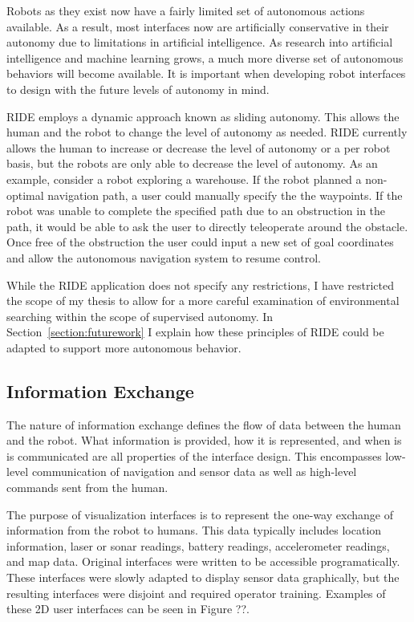 Robots as they exist now have a fairly limited set of autonomous actions available. As a result, most interfaces now are artificially conservative in their autonomy due to limitations in artificial intelligence. As research into artificial intelligence and machine learning grows, a much more diverse set of autonomous behaviors will become available. It is important when developing robot interfaces to design with the future levels of autonomy in mind. 

RIDE employs a dynamic approach known as sliding autonomy. This allows the human and the robot to change the level of autonomy as needed. RIDE currently allows the human to increase or decrease the level of autonomy or a per robot basis, but the robots are only able to decrease the level of autonomy. As an example, consider a robot exploring a warehouse. If the robot planned a non-optimal navigation path, a user could manually specify the the waypoints. If the robot was unable to complete the specified path due to an obstruction in the path, it would be able to ask the user to directly teleoperate around the obstacle. Once free of the obstruction the user could input a new set of goal coordinates and allow the autonomous navigation system to resume control.

While the RIDE application does not specify any restrictions, I have restricted the scope of my thesis to allow for a more careful examination of environmental searching within the scope of supervised autonomy. In Section~\ref{section:futurework} I explain how these principles of RIDE could be adapted to support more autonomous behavior.

\subsection{Information Exchange}

The nature of information exchange defines the flow of data between the human and the robot. What information is provided, how it is represented, and when is is communicated are all properties of the interface design. This encompasses low-level communication of navigation and sensor data as well as high-level commands sent from the human. 

The purpose of visualization interfaces is to represent the one-way exchange of information from the robot to humans. This data typically includes location information, laser or sonar readings, battery readings, accelerometer readings, and map data. Original interfaces were written to be accessible programatically. These interfaces were slowly adapted to display sensor data graphically, but the resulting interfaces were disjoint and required operator training. Examples of these 2D user interfaces can be seen in Figure ??.

